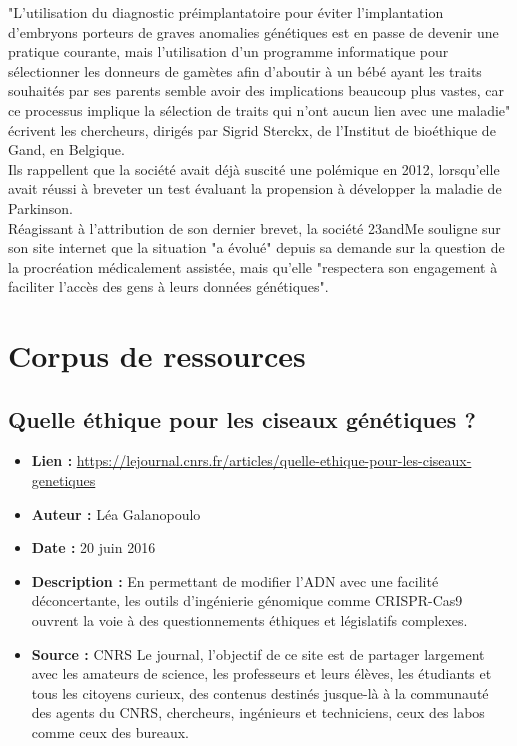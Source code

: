 \documentclass[8pt]{article}
\begin{document}
"L'utilisation du diagnostic préimplantatoire pour éviter l'implantation d'embryons porteurs de graves anomalies génétiques est en passe de devenir une pratique courante, mais l'utilisation d'un programme informatique pour sélectionner les donneurs de gamètes afin d'aboutir à un bébé ayant les traits souhaités par ses parents semble avoir des implications beaucoup plus vastes, car ce processus implique la sélection de traits qui n'ont aucun lien avec une maladie" écrivent les chercheurs, dirigés par Sigrid Sterckx, de l'Institut de bioéthique de Gand, en Belgique.\\

Ils rappellent que la société avait déjà suscité une polémique en 2012, lorsqu'elle avait réussi à breveter un test évaluant la propension à développer la maladie de Parkinson.\\

Réagissant à l'attribution de son dernier brevet, la société 23andMe souligne sur son site internet que la situation "a évolué" depuis sa demande sur la question de la procréation médicalement assistée, mais qu'elle "respectera son engagement à faciliter l'accès des gens à leurs données génétiques". \\

\newpage
\section{Corpus de ressources}
\subsection{Quelle éthique pour les ciseaux génétiques ?}
 
\begin{itemize}
	\item \textbf{Lien : }  \url{https://lejournal.cnrs.fr/articles/quelle-ethique-pour-les-ciseaux-genetiques} 
	\item \textbf{Auteur : } Léa Galanopoulo
	\item \textbf{Date : } 20 juin 2016
	\item \textbf{Description : } En permettant de modifier l’ADN avec une facilité déconcertante, les outils d’ingénierie génomique comme CRISPR-Cas9 ouvrent la voie à des questionnements éthiques et législatifs complexes.
	\item \textbf{Source : } CNRS Le journal, l'objectif de ce site est de partager largement avec les amateurs de science, les professeurs et leurs élèves, les étudiants et tous les citoyens curieux, des contenus destinés jusque-là à la communauté des agents du CNRS, chercheurs, ingénieurs et techniciens, ceux des labos comme ceux des bureaux.
\end{itemize}
\end{document}
